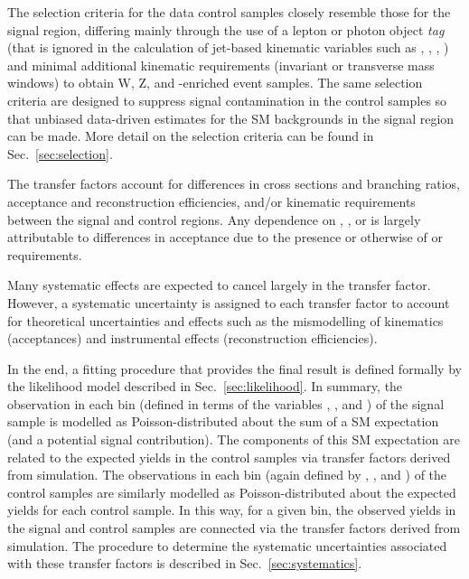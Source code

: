 The selection criteria for the data control samples closely resemble
those for the signal region, differing mainly through the use of a
lepton or photon object {\it tag} (that is ignored in the calculation
of jet-based kinematic variables such as \scalht, \mht, \alphat, \etc)
and minimal additional kinematic requirements (\eg invariant or
transverse mass windows) to obtain W, Z, and \ttbar-enriched event
samples. The same selection criteria are designed to suppress signal
contamination in the control samples so that unbiased data-driven
estimates for the SM backgrounds in the signal region can be
made. More detail on the selection criteria can be found in Sec.~\ref{sec:selection}.

The transfer factors account for differences in cross sections and
branching ratios, acceptance and reconstruction efficiencies, and/or
kinematic requirements between the signal and control regions. Any
dependence on \njet, \nb, or \HT is largely attributable to
differences in acceptance due to the presence or otherwise of \alphat
or \mht requirements.

Many systematic effects are expected to cancel largely in the transfer
factor. However, a systematic uncertainty is assigned to each transfer
factor to account for theoretical uncertainties and effects such as
the mismodelling of kinematics (\eg acceptances) and instrumental
effects (\eg reconstruction efficiencies).

In the end, a fitting procedure that provides the final result is
defined formally by the likelihood model described in
Sec.~\ref{sec:likelihood}. In summary, the observation in each bin
(defined in terms of the variables \njet, \nb, and \scalht) of the
signal sample is modelled as Poisson-distributed about the sum of a SM
expectation (and a potential signal contribution). The components of
this SM expectation are related to the expected yields in the control
samples via transfer factors derived from simulation. The observations
in each bin (again defined by \njet, \nb, and \scalht) of the control
samples are similarly modelled as Poisson-distributed about the
expected yields for each control sample. In this way, for a given
bin, the observed yields in the signal and control samples are
connected via the transfer factors derived from simulation. 
The procedure to determine the systematic uncertainties associated
with these transfer factors is described in
Sec.~\ref{sec:systematics}.


